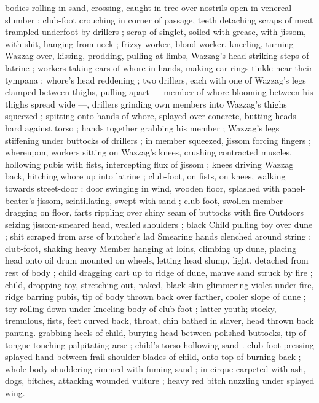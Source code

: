 bodies rolling in sand, crossing, caught in tree over nostrils open in 
venereal slumber ; club-foot crouching in corner of passage, teeth 
detaching scraps of meat trampled underfoot by drillers ; scrap of 
singlet, soiled with grease, with jissom, with shit, hanging from neck 
; frizzy worker, blond worker, kneeling, turning Wazzag over, kissing, 
prodding, pulling at limbs, Wazzag's head striking steps of latrine ; 
workers taking ears of whore in hands, making ear-rings tinkle near 
their tympana : whore's head reddening ; two drillers, each with one 
of Wazzag's legs clamped between thighs, pulling apart --- member 
of whore blooming between his thighs spread wide ---, drillers 
grinding own members into Wazzag's thighs squeezed ; spitting onto 
hands of whore, splayed over concrete, butting heads hard against 
torso ; hands together grabbing his member ; Wazzag's legs 
stiffening under buttocks of drillers ; in member squeezed, jissom 
forcing fingers ; whereupon, workers sitting on Wazzag's knees, 
crushing contracted muscles, hollowing pubis with fists, intercepting 
flux of jissom ; knees driving Wazzag back, hitching whore up into 
latrine ; club-foot, on fists, on knees, walking towards street-door : 
door swinging in wind, wooden floor, splashed with panel-beater's 
jissom, scintillating, swept with sand ; club-foot, swollen member 
dragging on floor, farts rippling over shiny seam of buttocks with fire 
Outdoors seizing jissom-smeared head, wealed shoulders ; black 
Child pulling toy over dune ; shit scraped from arse of butcher's lad 
Smearing hands clenched around string ; club-foot, shaking heavy 
Member hanging at loins, climbing up dune, placing head onto oil 
drum mounted on wheels, letting head slump, light, detached from 
rest of body ; child dragging cart up to ridge of dune, mauve sand 
struck by fire ; child, dropping toy, stretching out, naked, black skin 
glimmering violet under fire, ridge barring pubis, tip of body thrown 
back over farther, cooler slope of dune ; toy rolling down under 
kneeling body of club-foot ; latter youth; stocky, tremulous, fists, feet 
curved back, throat, chin bathed in slaver, head thrown back panting. 
grabbing heels of child, burying head between polished buttocks, tip 
of tongue touching palpitating arse ; child's torso hollowing sand . 
club-foot pressing splayed hand between frail shoulder-blades of 
child, onto top of burning back ; whole body shuddering rimmed with 
fuming sand ; in cirque carpeted with ash, dogs, bitches, attacking 
wounded vulture ; heavy red bitch nuzzling under splayed wing. 
